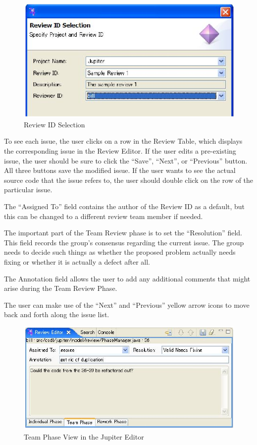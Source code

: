 \begin{figure}[htbp]
  \centering
  \includegraphics{images/fig3-29.eps}
  \caption{Review ID Selection}
  \label{fig3-29}
\end{figure}

To see each issue, the user clicks on a row in the Review Table, which displays the corresponding issue in the Review Editor.  If the user edits a pre-existing issue, the user should be sure to click the ``Save'', ``Next'', or ``Previous'' button. All three buttons save the modified issue. If the user wants to see the actual source code that the issue refers to, the user should double click on the row of the particular issue.

The ``Assigned To'' field contains the author of the Review ID as a default, but this can be changed to a different review team member if needed.

The important part of the Team Review phase is to set the ``Resolution'' field.  This field records the group's consensus regarding the current issue. The group needs to decide such things as whether the proposed problem actually needs fixing or whether it is actually a defect after all.

The Annotation field allows the user to add any additional comments that might arise during the Team Review Phase.

The user can make use of the ``Next'' and ``Previous'' yellow arrow icons to move back and forth along the issue list.

\begin{figure}[htbp]
  \centering
  \includegraphics{images/fig3-30.eps}
  \caption{Team Phase View in the Jupiter Editor}
  \label{fig3-30}
\end{figure}


